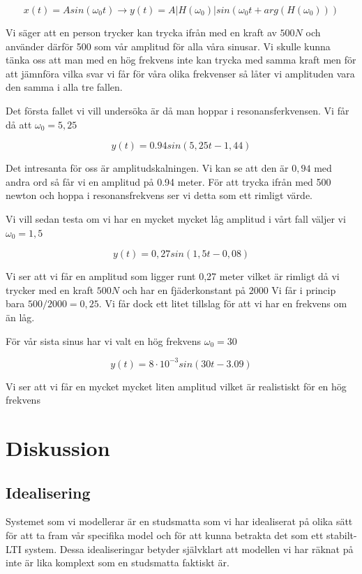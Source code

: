 \documentclass[10pt,a4paper]{article}
\begin{document}
\begin{equation}
x(t) = A sin(\omega_0t) \rightarrow y(t) = A|H(\omega_0)|sin(\omega_0t + arg(H(\omega_0)))
\end{equation}

Vi säger att en person trycker kan trycka ifrån med en kraft av $500N$ och använder därför 500 som vår amplitud för alla våra sinusar. Vi skulle kunna tänka oss att man med en hög frekvens inte kan trycka med samma kraft men för att jämnföra vilka svar vi får för våra olika frekvenser så låter vi amplituden vara den samma i alla tre fallen.

Det första fallet vi vill undersöka är då man hoppar i resonansferkvensen. Vi får då att $\omega_0 = 5,25$

\begin{equation}
y(t) = 0.94 sin(5,25 t - 1,44)
\end{equation}

Det intresanta för oss är amplitudskalningen. Vi kan se att den är $0,94$ med andra ord så får vi en amplitud på 0.94 meter. För att trycka ifrån med 500 newton och hoppa i resonansfrekvens ser vi detta som ett rimligt värde.

Vi vill sedan testa om vi har en mycket mycket låg amplitud i vårt fall väljer vi $\omega_0 = 1,5$

\begin{equation}
y(t) = 0,27 sin(1,5 t - 0,08)
\end{equation}

Vi ser att vi får en amplitud som ligger runt 0,27 meter vilket är rimligt då vi trycker med en kraft $500N$ och har en fjäderkonstant på $2000$ Vi får i princip bara $500/2000 = 0,25$. Vi får dock ett litet tillslag för att vi har en frekvens om än låg.

För vår sista sinus har vi valt en hög frekvens $\omega_0 = 30$

\begin{equation}
y(t) = 8\cdot 10^{-3} sin(30 t - 3.09)
\end{equation}

Vi ser att vi får en mycket mycket liten amplitud vilket är realistiskt för en hög frekvens

\section{Diskussion}

\subsection{Idealisering}
Systemet som vi modellerar är en studsmatta som vi har idealiserat på olika sätt för att ta fram vår specifika model och för att kunna betrakta det som ett stabilt-LTI system. Dessa idealiseringar betyder självklart att modellen vi har räknat på inte är lika komplext som en studsmatta faktiskt är. 
\end{document}
